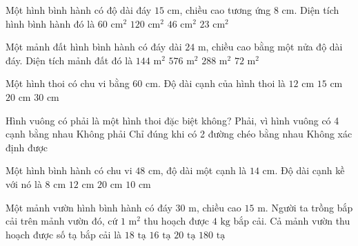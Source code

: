 \begin{ex} %
Một hình bình hành có độ dài đáy $15\text{ cm}$, chiều cao tương ứng $8\text{ cm}$. Diện tích hình bình hành đó là
\choice
{$60\text{ cm}^2$}
{\True $120\text{ cm}^2$}
{$46\text{ cm}^2$}
{$23\text{ cm}^2$}
\end{ex}

\begin{ex} %
Một mảnh đất hình bình hành có đáy dài $24\text{ m}$, chiều cao bằng một nửa độ dài đáy. Diện tích mảnh đất đó là
\choice
{$144\text{ m}^2$}
{$576\text{ m}^2$}
{\True $288\text{ m}^2$}
{$72\text{ m}^2$}
\end{ex}

\begin{ex} %
Một hình thoi có chu vi bằng $60\text{ cm}$. Độ dài cạnh của hình thoi là
\choice
{$12\text{ cm}$}
{\True $15\text{ cm}$}
{$20\text{ cm}$}
{$30\text{ cm}$}
\end{ex}

\begin{ex} %
Hình vuông có phải là một hình thoi đặc biệt không?
\choice
{\True Phải, vì hình vuông có 4 cạnh bằng nhau}
{Không phải}
{Chỉ đúng khi có 2 đường chéo bằng nhau}
{Không xác định được}
\end{ex}

\begin{ex} %
Một hình bình hành có chu vi $48\text{ cm}$, độ dài một cạnh là $14\text{ cm}$. Độ dài cạnh kề với nó là
\choice
{$8\text{ cm}$}
{$12\text{ cm}$}
{$20\text{ cm}$}
{\True $10\text{ cm}$}
\end{ex}

\begin{ex} %
Một mảnh vườn hình bình hành có đáy $30\text{ m}$, chiều cao $15\text{ m}$. Người ta trồng bắp cải trên mảnh vườn đó, cứ $1\text{ m}^2$ thu hoạch được $4\text{ kg}$ bắp cải. Cả mảnh vườn thu hoạch được số tạ bắp cải là
\choice
{\True $18\text{ tạ}$}
{$16\text{ tạ}$}
{$20\text{ tạ}$}
{$180\text{ tạ}$}
\end{ex}

